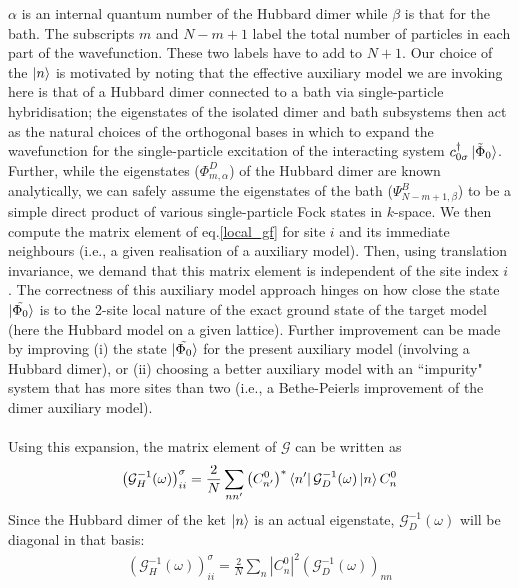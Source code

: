 \documentclass[12pt]{article}
\numberwithin{equation}{section}
\begin{document}
$\alpha$ is an internal quantum number of the Hubbard dimer while $\beta$ is that for the bath. The subscripts $m$ and $N-m+1$ label the total number of particles in each part of the wavefunction. These two labels have to add to $N+1$. Our choice of the $\ket{n}$ is motivated by noting that the effective auxiliary model we are invoking here is that of a Hubbard dimer connected to a bath via single-particle hybridisation; the eigenstates of the isolated dimer and bath subsystems then act as the natural choices of the orthogonal bases in which to expand the wavefunction for the single-particle excitation of the interacting system $c^\dagger_{0\sigma}\ket{\tilde \Phi_0}$. Further, while the eigenstates ($\Phi^D_{m,\alpha}$) of the Hubbard dimer are known analytically, we can safely assume the eigenstates of the bath ($\Psi^B_{N-m+1, \beta}$) to be a simple direct product of various single-particle Fock states in $k$-space. We then compute the matrix element of eq.\eqref{local_gf} for site $i$ and its immediate neighbours (i.e., a given realisation of a auxiliary model). Then, using translation invariance, we demand that this matrix element is independent of the site index $i$. The correctness of this auxiliary model approach hinges on how close the state $\ket{\tilde{\Phi_0}}$ is to the 2-site local nature of the exact ground state of the target model (here the Hubbard model on a given lattice). Further improvement can be made by improving (i) the state $\ket{\tilde{\Phi_0}}$ for the present auxiliary model (involving a Hubbard dimer), or (ii) choosing a better auxiliary model with an ``impurity" system that has more sites than two (i.e., a Bethe-Peierls improvement of the dimer auxiliary model).
\\\\
Using this expansion, the matrix element of $\mathcal{G}$ can be written as
\begin{equation}\begin{aligned}
	\left(\mathcal{G}_{H}^{-1}(\omega)\right)_{ii}^\sigma = \frac{2}{N}\sum_{nn^\prime} \left(C^0_{n^\prime}\right)^*\bra{n^\prime}\mathcal{G}_{D}^{-1}(\omega)\ket{n} C^0_{n}
\end{aligned}\end{equation}
Since the Hubbard dimer of the ket $\ket{n}$ is an actual eigenstate, $\mathcal{G}_{D}^{-1}(\omega)$ will be diagonal in that basis:
\begin{equation}\begin{aligned}
	\left(\mathcal{G}_{H}^{-1}(\omega)\right)_{ii}^\sigma = \frac{2}{N}\sum_{n} |C^0_{n}|^2 \left(\mathcal{G}_{D}^{-1}(\omega)\right)_{n n} 
\end{aligned}\end{equation}
\end{document}
